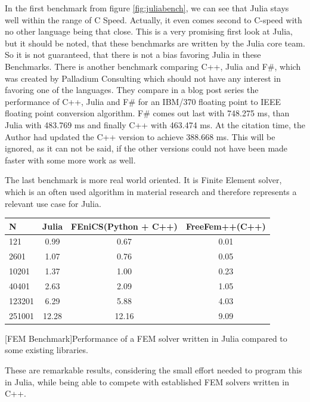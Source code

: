 In the first benchmark from figure \ref{fig:juliabench}, we can see that Julia stays well within the range of C Speed. 
Actually, it even comes second to C-speed with no other language being that close.
This is a very promising first look at Julia, but it should be noted, that these benchmarks are written by the Julia core team.
So it is not guaranteed, that there is not a bias favoring Julia in these Benchmarks.
There is another benchmark comparing C++, Julia and F#, which was created by Palladium Consulting which should not have any interest in favoring one of the languages.
They compare in a blog post series \cite{JuliaFSCpp} the performance of C++, Julia and F\# for an IBM/370 floating point to IEEE floating point conversion algorithm.
F\# comes out last with 748.275 ms, than Julia with 483.769 ms and finally C++ with 463.474 ms. 
At the citation time, the Author had updated the C++ version to achieve 388.668 ms. 
This will be ignored, as it can not be said, if the other versions could not have been made faster with some more work as well.

The last benchmark is more real world oriented. 
It is Finite Element solver, which is an often used algorithm in material research and therefore represents a relevant use case for Julia.

\begin{table}[htbp]
    \centering
    \begin{tabular}{l|c|c|c}
        \hline
        \textbf{N}  & \textbf{Julia} & \textbf{FEniCS(Python + C++)}  & \textbf{FreeFem++(C++)}\\
        \hline
        121         & 0.99           & 0.67             & 0.01 \\
        2601        & 1.07           & 0.76             & 0.05 \\
        10201       & 1.37           & 1.00             & 0.23 \\
        40401       & 2.63           & 2.09             & 1.05 \\
        123201      & 6.29           & 5.88             & 4.03 \\
        251001      & 12.28          & 12.16            & 9.09 \\
        \hline
    \end{tabular}
    [FEM Benchmark]{Performance of a FEM solver written in Julia compared to some existing libraries. \cite{FMSolver}}
    \label{table:fembench}
\end{table}
These are remarkable results, considering the small effort needed to program this in Julia, while being able to compete with established FEM solvers written in C++.


